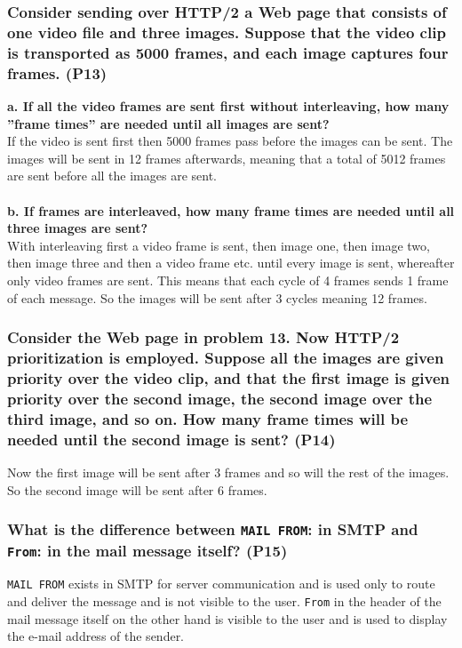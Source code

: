 \subsubsection{Consider sending over HTTP/2 a Web page that consists of one video file and three images. Suppose that the video clip is transported as 5000 frames, and each image captures four frames. (P13)}

\textbf{a. If all the video frames are sent first without interleaving, how many ''frame times'' are needed until all images are sent?} \\
If the video is sent first then 5000 frames pass before the images can be sent. The images will be sent in 12 frames afterwards, meaning that a total of 5012 frames are sent before all the images are sent. \\
\\
\textbf{b. If frames are interleaved, how many frame times are needed until all three images are sent?} \\
With interleaving first a video frame is sent, then image one, then image two, then image three and then a video frame etc. until every image is sent, whereafter only video frames are sent. This means that each cycle of 4 frames sends 1 frame of each message. So the images will be sent after 3 cycles meaning 12 frames.


\subsubsection{Consider the Web page in problem 13. Now HTTP/2 prioritization is employed. Suppose all the images are given priority over the video clip, and that the first image is given priority over the second image, the second image over the third image, and so on. How many frame times will be needed until the second image is sent? (P14)}

Now the first image will be sent after 3 frames and so will the rest of the images. So the second image will be sent after 6 frames.

\subsubsection{What is the difference between \texttt{MAIL FROM}: in SMTP and \texttt{From}: in the mail message itself? (P15)}

\texttt{MAIL FROM} exists in SMTP for server communication and is used only to route and deliver the message and is not visible to the user. \texttt{From} in the header of the mail message itself on the other hand is visible to the user and is used to display the e-mail address of the sender.


